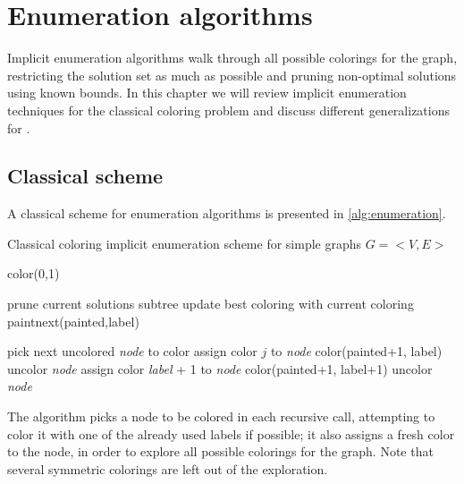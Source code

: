 
\chapter{Enumeration algorithms}
\label{sec:heur}

Implicit enumeration algorithms walk through all possible colorings for the graph, restricting the solution set as much as possible and pruning non-optimal solutions using known bounds. In this chapter we will review implicit enumeration techniques for the classical coloring problem and discuss different generalizations for \PCP{}.

\section{Classical scheme}

A classical scheme for enumeration algorithms is presented in \ref{alg:enumeration}.

\begin{algorithm}
\caption{Classical coloring implicit enumeration scheme for simple graphs $G = <V,E>$}
\label{alg:enumeration}

\begin{algorithmic}
\CALL color(0,1)

		\STATE prune current solutions subtree
		\STATE update best coloring with current coloring
	\ELSE
		\CALL paintnext(painted,label)
	\ENDIF
\ENDPROC

		\STATE pick next uncolored \textit{node} to color		
				\STATE assign color $j$ to \textit{node}
				\CALL color(painted+1, label)
				\STATE uncolor \textit{node}
			\ENDIF
		\ENDFOR
		\STATE assign color \textit{label} + 1 to \textit{node}
		\CALL color(painted+1, label+1)
		\STATE uncolor \textit{node}
\ENDPROC

\end{algorithmic}
\end{algorithm}

The algorithm picks a node to be colored in each recursive call, attempting to color it with one of the already used labels if possible; it also assigns a fresh color to the node, in order to explore all possible colorings for the graph. Note that several symmetric colorings are left out of the exploration. 

